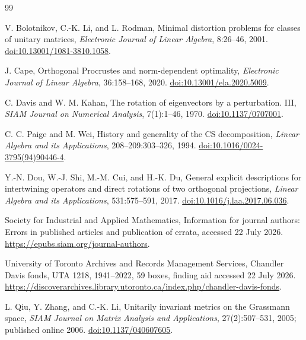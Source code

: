 \documentclass[11pt]{article}
\begin{document}
\begin{thebibliography}{99}

V. Bolotnikov, C.-K. Li, and L. Rodman,
\newblock Minimal distortion problems for classes of unitary matrices,
\newblock \emph{Electronic Journal of Linear Algebra}, 8:26--46, 2001.
\newblock \href{https://doi.org/10.13001/1081-3810.1058}{doi:10.13001/1081-3810.1058}.

J. Cape,
\newblock Orthogonal Procrustes and norm-dependent optimality,
\newblock \emph{Electronic Journal of Linear Algebra}, 36:158--168, 2020.
\newblock \href{https://doi.org/10.13001/ela.2020.5009}{doi:10.13001/ela.2020.5009}.

C. Davis and W. M. Kahan,
\newblock The rotation of eigenvectors by a perturbation. III,
\newblock \emph{SIAM Journal on Numerical Analysis}, 7(1):1--46, 1970.
\newblock \href{https://doi.org/10.1137/0707001}{doi:10.1137/0707001}.


C. C. Paige and M. Wei,
\newblock History and generality of the CS decomposition,
\newblock \emph{Linear Algebra and its Applications}, 208--209:303--326, 1994.
\newblock \href{https://doi.org/10.1016/0024-3795(94)90446-4}{doi:10.1016/0024-3795(94)90446-4}.

Y.-N. Dou, W.-J. Shi, M.-M. Cui, and H.-K. Du,
\newblock General explicit descriptions for intertwining operators and direct rotations of two orthogonal projections,
\newblock \emph{Linear Algebra and its Applications}, 531:575--591, 2017.
\newblock \href{https://doi.org/10.1016/j.laa.2017.06.036}{doi:10.1016/j.laa.2017.06.036}.

Society for Industrial and Applied Mathematics,
\newblock Information for journal authors: Errors in published articles and publication of errata,
\newblock accessed 22 July 2026.
\newblock \url{https://epubs.siam.org/journal-authors}.

University of Toronto Archives and Records Management Services,
\newblock Chandler Davis fonds, UTA 1218, 1941--2022, 59 boxes,
\newblock finding aid accessed 22 July 2026.
\newblock \url{https://discoverarchives.library.utoronto.ca/index.php/chandler-davis-fonds}.

L. Qiu, Y. Zhang, and C.-K. Li,
\newblock Unitarily invariant metrics on the Grassmann space,
\newblock \emph{SIAM Journal on Matrix Analysis and Applications},
27(2):507--531, 2005; published online 2006.
\newblock \href{https://doi.org/10.1137/040607605}{doi:10.1137/040607605}.

\end{thebibliography}
\end{document}

